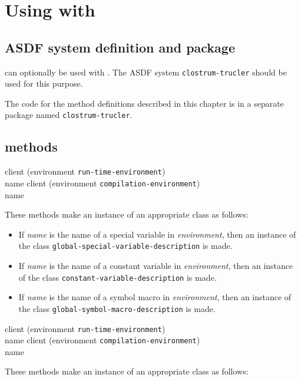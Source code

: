 \chapter{Using \trucler{} with \sysname{}}

\section{ASDF system definition and package}

\trucler{} can optionally be used with \sysname{}.  The ASDF system
\texttt{clostrum-trucler} should be used for this purpose.

The code for the method definitions described in this chapter is in a
separate package named \texttt{clostrum-trucler}.

\section{\trucler{} methods}

 {client (environment
  {\tt run-time-environment}) \\ name}
 {client (environment
  {\tt compilation-environment}) \\ name}

These methods make an instance of an appropriate \trucler{} class
as follows:

\begin{itemize}
\item If \textit{name} is the name of a special variable in
  \textit{environment}, then an instance of the \trucler{} class
  \texttt{global-special-variable-description} is made.
\item If \textit{name} is the name of a constant variable in
  \textit{environment}, then an instance of the \trucler{} class
  \texttt{constant-variable-description} is made.
\item If \textit{name} is the name of a symbol macro in
  \textit{environment}, then an instance of the \trucler{} class
  \texttt{global-symbol-macro-description} is made.
\end{itemize}

 {client (environment
  {\tt run-time-environment}) \\ name}
 {client (environment
  {\tt compilation-environment}) \\ name}

These methods make an instance of an appropriate \trucler{} class
as follows:

